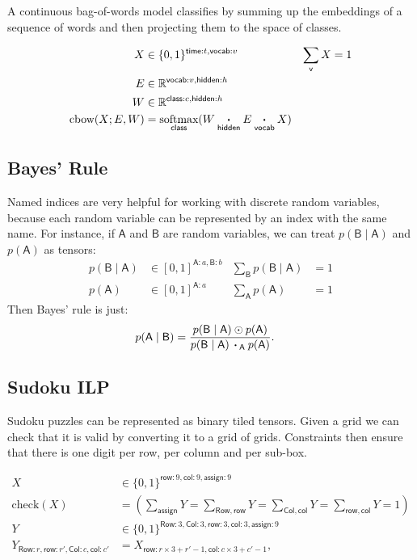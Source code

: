 \documentclass{article}
\newcommand{\name}[1]{\mathsf{#1}}
\newcommand{\ndot}[1]{\mathbin{\mathop{\thinspace\boldsymbol\cdot\thinspace}\displaylimits_{\name{#1}}}}
\newcommand{\nsum}[1]{\mathop{\sum}_{\name{#1}}}
\newcommand{\nfun}[2]{\mathop{\text{#2}}\displaylimits_{\name{#1}}}
\newcommand{\reals}{\mathbb{R}}
\begin{document}
A continuous bag-of-words model classifies by summing up the embeddings of a sequence of words and then projecting them to the space of classes. 

\begin{align*} 
X &\in \{0, 1\}^{{\name{time}:t, \name{vocab}:v}} & \nsum{v} X &= 1\\
E &\in \reals^{{\name{vocab}:v, \name{hidden}:h}}\\
W &\in \reals^{{\name{class}:c, \name{hidden}:h}}\\
\text{cbow}(X; E, W) &= \nfun{class}{softmax} (W \ndot{hidden} E \ndot{vocab} X)
\end{align*}

\subsection{Bayes' Rule}

Named indices are very helpful for working with discrete random variables, because each random variable can be represented by an index with the same name. For instance, if $\name{A}$ and $\name{B}$ are random variables, we can treat $p(\name{B} \mid \name{A})$ and $p(\name{A})$ as tensors:
\begin{align*} 
p(\name{B} \mid \name{A}) &\in [0, 1]^{\name{A}:a, \name{B}:b} & \nsum{B} p(\name{B}\mid \name{A}) &= 1 \\
p(\name{A}) &\in [0, 1]^{\name{A}:a} & \nsum{A} p(\name{A}) &= 1
\end{align*}
Then Bayes' rule is just:
\begin{align*}
p(\name{A} \mid \name{B}) &= \frac{p(\name{B} \mid \name{A}) \odot p(\name{A})}{p(\name{B} \mid \name{A}) \ndot{A} p(\name{A})}.
\end{align*}

\subsection{Sudoku ILP}

Sudoku puzzles can be represented as  binary tiled tensors.
Given a grid we can check that it is valid by converting it to a grid of grids. 
Constraints then ensure that there is one digit per row, per column and per sub-box. 

\begin{align*} 
X &\in \{0, 1\}^{\name{row}: 9, \name{col}:9, \name{assign}:9}  \\
\text{check}(X) &=
\left(\nsum{assign} Y = 
\nsum{Row,row} Y = 
\nsum{Col, col} Y =  
\nsum{row, col} Y = 1 \right) \\
Y &\in \{0, 1\}^{\name{Row}: 3, \name{Col}:3, \name{row}: 3, \name{col}:3, \name{assign}:9}  \\
Y_{\name{Row}:r, \name{row}:r', \name{Col}:c, \name{col}:c'} &= X_{\name{row}:r\times 3 + r'-1, \name{col}:c\times3 + c'-1}, 
\end{align*} 
\end{document}
